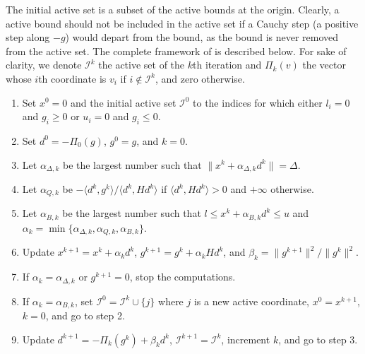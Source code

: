 \documentclass[letterpaper,10pt,english]{sphinxmanual}
\newcommand{\norm}[2][]{#1\lVert#2#1\rVert}
\newcommand{\set}[2][]{#1\{#2#1\}}
\newcommand{\inner}[2][]{#1\langle#2#1\rangle}
\begin{document}
\sphinxAtStartPar
The initial active set is a subset of the active bounds at the origin. Clearly,
a active bound should not be included in the active set if a Cauchy step (a
positive step along \(-g\)) would depart from the bound, as the bound is
never removed from the active set. The complete framework of  is
described below. For sake of clarity, we denote \(\mathcal{I}^k\) the
active set of the \(k\)\sphinxhyphen{}th iteration and \(\Pi_k(v)\) the vector whose
\(i\)\sphinxhyphen{}th coordinate is \(v_i\) if \(i \notin \mathcal{I}^k\), and
zero otherwise.
\begin{enumerate}
%
\item {} 
\sphinxAtStartPar
Set \(x^0 = 0\) and the initial active set \(\mathcal{I}^0\) to the
indices for which either \(l_i = 0\) and \(g_i \ge 0\) or
\(u_i = 0\) and \(g_i \le 0\).

\item {} 
\sphinxAtStartPar
Set \(d^0 = -\Pi_0(g)\), \(g^0 = g\), and
\(k = 0\).

\item {} 
\sphinxAtStartPar
Let \(\alpha_{\Delta, k}\) be the largest number such that
\(\norm{x^k + \alpha_{\Delta, k} d^k} = \Delta\).

\item {} 
\sphinxAtStartPar
Let \(\alpha_{Q, k}\) be \(-\inner{d^k, g^k} / \inner{d^k, Hd^k}\)
if \(\inner{d^k, Hd^k} > 0\) and \(+\infty\) otherwise.

\item {} 
\sphinxAtStartPar
Let \(\alpha_{B, k}\) be the largest number such that
\(l \le x^k + \alpha_{B, k} d^k \le u\) and
\(\alpha_k = \min \set{\alpha_{\Delta, k}, \alpha_{Q, k}, \alpha_{B, k}}\).

\item {} 
\sphinxAtStartPar
Update \(x^{k + 1} = x^k + \alpha_k d^k\),
\(g^{k + 1} = g^k + \alpha_k H d^k\), and
\(\beta_k = \norm{g^{k + 1}}^2 / \norm{g^k}^2\).

\item {} 
\sphinxAtStartPar
If \(\alpha_k = \alpha_{\Delta, k}\) or \(g^{k + 1} = 0\), stop the
computations.

\item {} 
\sphinxAtStartPar
If \(\alpha_k = \alpha_{B, k}\), set
\(\mathcal{I}^0 = \mathcal{I}^k \cup \set{j}\) where \(j\) is a
new active coordinate, \(x^0 = x^{k + 1}\), \(k = 0\), and go to
step 2.

\item {} 
\sphinxAtStartPar
Update \(d^{k + 1} = -\Pi_k(g^k) + \beta_k d^k\),
\(\mathcal{I}^{k + 1} = \mathcal{I}^k\), increment \(k\), and go to
step 3.

\end{enumerate}
\end{document}
